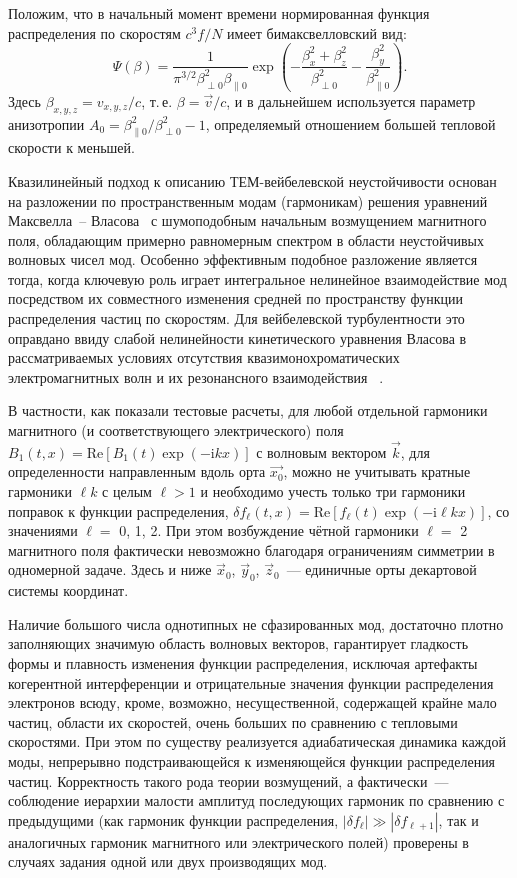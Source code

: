 Положим, что в начальный момент времени нормированная функция распределения по скоростям $c^3f/N$ имеет бимаксвелловский вид:
\begin{equation}
\label{bimax}
\Psi({\beta})=\dfrac{1}{\pi^{3/2}\beta_{\perp0}^2 \beta_{\|0} } \exp\left(-\dfrac{\beta_x^2+\beta_z^2}{\beta_{\perp0}^2}-\dfrac{\beta_y^2}{\beta_{\|0}^2}\right).
\end{equation}
Здесь $\beta_{x,y,z}={v_{x,y,z}}/{c}$, т.\,е. ${\beta}=\vec{v}/{c}$, и в дальнейшем используется параметр анизотропии $A_0={\beta^2_{\|0}}/{\beta^2_{\perp0}}-1$, определяемый отношением большей тепловой скорости к меньшей.


Квазилинейный подход к описанию ТЕМ-вейбелевской неустойчивости основан на разложении по пространственным модам (гармоникам) решения уравнений  Максвелла~-- Власова~\cite{Baumjohann2012} с шумоподобным начальным возмущением магнитного поля, обладающим примерно равномерным спектром в области неустойчивых волновых чисел мод.
Особенно эффективным подобное разложение является тогда, когда ключевую роль играет интегральное нелинейное взаимодействие мод посредством их совместного изменения средней по пространству функции распределения частиц по скоростям. 
Для вейбелевской турбулентности это оправдано ввиду слабой нелинейности кинетического уравнения Власова в рассматриваемых условиях отсутствия квазимонохроматических электромагнитных волн и их резонансного взаимодействия ~\cite{Weibel1959,Davidson1972,Silva2020}.


В частности, как показали тестовые расчеты, для любой отдельной гармоники магнитного (и соответствующего электрического) поля $B_1(t,x)= \mathrm{Re} \left[ B_1(t)\exp(-\mathrm{i}kx) \right]$ с волновым вектором $\vec{k}$, для определенности направленным вдоль орта $\vec{x_0}$, можно не учитывать кратные гармоники $\ell k$ с целым $\ell > 1$ и необходимо учесть только три гармоники поправок к функции распределения, $\delta f_\ell(t, x)=\mathrm{Re} \left[ f_\ell(t)\exp(-\mathrm{i}\ell kx) \right]$, со значениями $\ell =$ 0, 1, 2. 
При этом возбуждение чётной гармоники $\ell=$ 2 магнитного поля фактически невозможно благодаря ограничениям симметрии в одномерной задаче. 
Здесь и ниже $\vec{x}_0$, $\vec{y}_0$, $\vec{z}_0$~--- единичные орты декартовой системы координат. 

Наличие большого числа однотипных не сфазированных мод, достаточно плотно заполняющих значимую область волновых векторов, гарантирует гладкость формы и плавность изменения функции распределения, исключая артефакты когерентной интерференции и отрицательные значения функции распределения электронов всюду, кроме, возможно, несущественной, содержащей крайне мало частиц, области их скоростей, очень больших по сравнению с тепловыми скоростями. 
При этом по существу реализуется адиабатическая динамика каждой моды, непрерывно подстраивающейся к изменяющейся функции распределения частиц. 
Корректность такого рода теории возмущений, а фактически~--- соблюдение иерархии малости амплитуд последующих гармоник по сравнению с предыдущими (как гармоник функции распределения, $|\delta f_ \ell|\gg |\delta f_{\ell+1}|$, так и аналогичных гармоник магнитного или электрического полей) проверены в случаях задания одной или двух производящих мод. 

